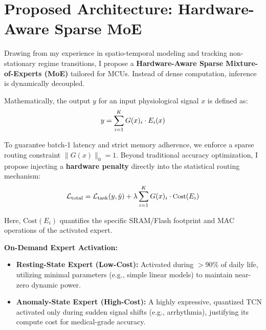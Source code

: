 \documentclass[10pt,a4paper]{article}
\begin{document}
\section{Proposed Architecture: Hardware-Aware Sparse MoE}
\vspace{-2pt}
{\small Drawing from my experience in spatio-temporal modeling and tracking non-stationary regime transitions, I propose a \textbf{Hardware-Aware Sparse Mixture-of-Experts (MoE)} tailored for MCUs. Instead of dense computation, inference is dynamically decoupled.

Mathematically, the output $y$ for an input physiological signal $x$ is defined as:
\vspace{-4pt}
\begin{equation}
\small y = \sum_{i=1}^{K} G(x)_i \cdot E_i(x)
\end{equation}
\vspace{-4pt}

To guarantee batch-1 latency and strict memory adherence, we enforce a sparse routing constraint $\|G(x)\|_0 = 1$. Beyond traditional accuracy optimization, I propose injecting a \textbf{hardware penalty} directly into the statistical routing mechanism:
\vspace{-4pt}
\begin{equation}
\small \mathcal{L}_{\text{total}} = \mathcal{L}_{\text{task}}(y, \hat{y}) + \lambda \sum_{i=1}^{K} G(x)_i \cdot \text{Cost}(E_i)
\end{equation}
\vspace{-4pt}

Here, $\text{Cost}(E_i)$ quantifies the specific SRAM/Flash footprint and MAC operations of the activated expert.

\textbf{On-Demand Expert Activation:}
\begin{itemize}
    \item \textbf{Resting-State Expert (Low-Cost):} Activated during $>$90\% of daily life, utilizing minimal parameters (e.g., simple linear models) to maintain near-zero dynamic power.
    \item \textbf{Anomaly-State Expert (High-Cost):} A highly expressive, quantized TCN activated only during sudden signal shifts (e.g., arrhythmia), justifying its compute cost for medical-grade accuracy.
\end{itemize}
}

\end{document}
